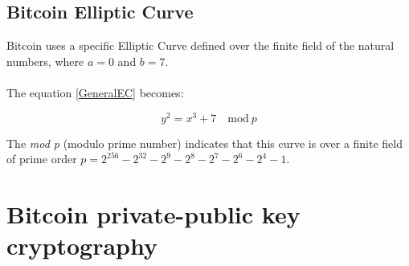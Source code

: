 \subsection{Bitcoin Elliptic Curve}
Bitcoin uses a specific Elliptic Curve defined over the finite field of the natural numbers, where $a=0$ and $b=7$. \\ \\
The equation \ref{GeneralEC} becomes:

\begin{equation}\label{BitcoinEC}
y^2=x^3+7 \quad \textrm{mod} \ p
\end{equation}

The \textit{mod p} (modulo prime number) indicates that this curve is over a finite field of prime order $p=2^{256}-2^{32}-2^9-2^8-2^7-2^6-2^4-1$.

\section{Bitcoin private-public key cryptography}





